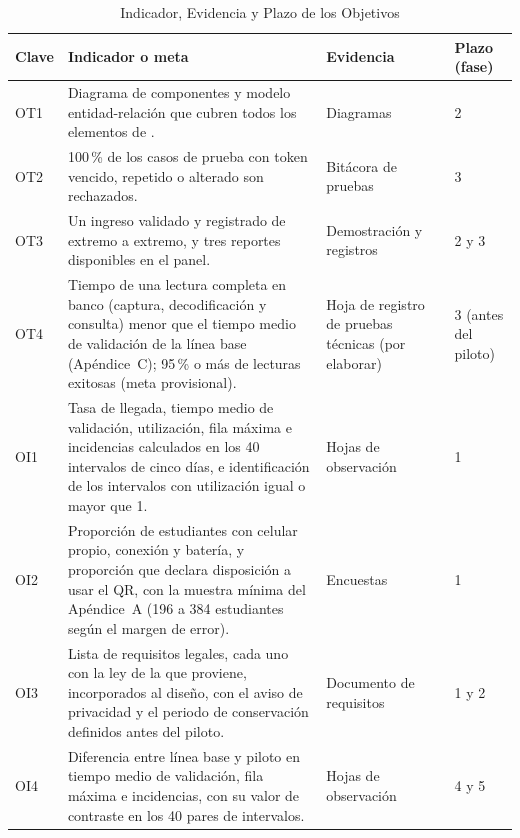 \begin{table}[tbp]
	\caption{Indicador, Evidencia y Plazo de los Objetivos}
	\label{tab:obj-smart}
	\small\linespread{1}\selectfont
	\begin{tabular}{@{}lP{7.6cm}P{3.9cm}P{2.2cm}@{}}
		\toprule
		Clave & Indicador o meta & Evidencia & Plazo (fase) \\
		\midrule
		OT1 & Diagrama de componentes y modelo entidad-relación que cubren todos los elementos de \figarq. & Diagramas & 2 \\[0.6em]
		OT2 & 100\,\% de los casos de prueba con token vencido, repetido o alterado son rechazados. & Bitácora de pruebas & 3 \\[0.6em]
		OT3 & Un ingreso validado y registrado de extremo a extremo, y tres reportes disponibles en el panel. & Demostración y registros & 2 y 3 \\[0.6em]
		OT4 & Tiempo de una lectura completa en banco (captura, decodificación y consulta) menor que el tiempo medio de validación de la línea base (Apéndice~C); 95\,\% o más de lecturas exitosas (meta provisional). & Hoja de registro de pruebas técnicas (por elaborar) & 3 (antes del piloto) \\[0.6em]
		OI1 & Tasa de llegada, tiempo medio de validación, utilización, fila máxima e incidencias calculados en los 40 intervalos de cinco días, e identificación de los intervalos con utilización igual o mayor que 1. & Hojas de observación & 1 \\[0.6em]
		OI2 & Proporción de estudiantes con celular propio, conexión y batería, y proporción que declara disposición a usar el QR, con la muestra mínima del Apéndice~A (196 a 384 estudiantes según el margen de error). & Encuestas & 1 \\[0.6em]
		OI3 & Lista de requisitos legales, cada uno con la ley de la que proviene, incorporados al diseño, con el aviso de privacidad y el periodo de conservación definidos antes del piloto. & Documento de requisitos & 1 y 2 \\[0.6em]
		OI4 & Diferencia entre línea base y piloto en tiempo medio de validación, fila máxima e incidencias, con su valor de contraste en los 40 pares de intervalos. & Hojas de observación & 4 y 5 \\
		\bottomrule
	\end{tabular}
\end{table}
